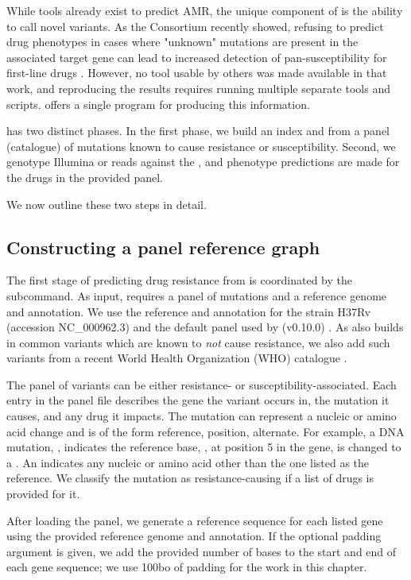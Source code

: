 While tools already exist to predict \mtb{} AMR, the unique component of \drprg{} is the ability to call novel variants. As the \cryptic{} Consortium recently showed, refusing to predict drug phenotypes in cases where "unknown" mutations are present in the associated target gene can lead to increased detection of pan-susceptibility for first-line drugs \cite{cryptic2018}. However, no tool usable by others was made available in that work, and reproducing the results requires running multiple separate tools and scripts. \drprg{} offers a single program for producing this information.

\drprg{} has two distinct phases. In the first phase, we build an index and \prg{} from a panel (catalogue) of mutations known to cause resistance or susceptibility. Second, we genotype Illumina or \ont{} reads against the \prg{}, and phenotype predictions are made for the drugs in the provided panel.

We now outline these two steps in detail.

\subsection{Constructing a panel reference graph}
\label{sec:drprg-index}

The first stage of predicting drug resistance from \drprg{} is coordinated by the  subcommand. As input,  requires a panel of mutations and a reference genome and annotation. We use the reference and annotation for the \mtb{} strain H37Rv (accession NC\_000962.3) and the default panel used by \mykrobe{} (v0.10.0) \cite{hunt2019}. As \mykrobe{} also builds in common variants which are known to \emph{not} cause resistance, we also add such variants from a recent World Health Organization (WHO) catalogue \cite{whopanel2021}. 

The panel of variants can be either resistance- or susceptibility-associated. Each entry in the panel file describes the gene the variant occurs in, the mutation it causes, and any drug it impacts. The mutation can represent a nucleic or amino acid change and is of the form reference, position, alternate. For example, a DNA mutation, , indicates the reference base, , at position 5 in the gene, is changed to a . An  indicates any nucleic or amino acid other than the one listed as the reference. We classify the mutation as resistance-causing if a list of drugs is provided for it.

After loading the panel, we generate a reference sequence for each listed gene using the provided reference genome and annotation. If the optional padding argument is given, we add the provided number of bases to the start and end of each gene sequence; we use 100bo of padding for the work in this chapter.

